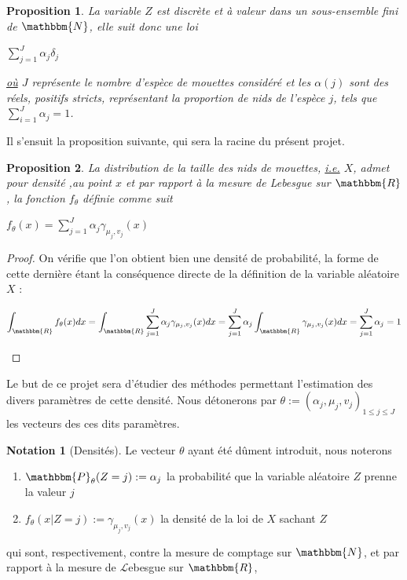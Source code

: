 \documentclass[frenchb]{report}
\newcommand{\R}{\mathbbm{R}}
\newcommand{\N}{\mathbbm{N}}
\newcommand{\1}{\mathbbm{1}}
\newcommand{\prob}{\mathbbm{P}}
\newtheorem{prop}{Proposition}
\theoremstyle{definition}\newtheorem{defn}{Définition}
\theoremstyle{definition}\newtheorem{exm}{Exemple}
\theoremstyle{definition}\newtheorem{nota}{Notation}
\theoremstyle{definition}\newtheorem{rem}{Remarque}
\begin{document}
\begin{prop}
La variable $Z$ est discrète et à valeur dans un sous-ensemble fini de $\N$, elle suit donc une loi 
\begin{center} $\displaystyle \sum_{j=1}^J \alpha_j\delta_j$ \end{center}
\underline{où} $J$ représente le nombre d'espèce de mouettes considéré et les $\alpha(j)$ sont des réels, positifs stricts, représentant la proportion de nids de l'espèce $j$, tels que $\displaystyle\sum_{i=1}^J \alpha_j = 1$.
\end{prop}

Il s'ensuit la proposition suivante, qui sera la racine du présent projet.
\begin{prop}
La distribution de la taille des nids de mouettes, \underline{i.e.} $X$, admet pour densité ,au point $x$ et par rapport à la mesure de Lebesgue sur $\R$, la fonction $f_ \theta$ définie comme suit
\begin{center} $f_\theta(x) = \displaystyle\sum_{j=1}^J \alpha_j \gamma_{\mu_j, v_j}(x) $ \end{center}
\end{prop}

\begin{proof}
On vérifie que l'on obtient bien une densité de probabilité, la forme de cette dernière étant la conséquence directe de la définition de la variable aléatoire $X$ : \newline
\begin{center} $\displaystyle\int_\R f_\theta(x) dx = \int_\R\sum_{j=1}^J \alpha_j \gamma_{\mu_j, v_j}(x)dx = \sum_{j=1}^J\alpha_j\int_\R \gamma_{\mu_j, v_j}(x)dx = \sum_{j=1}^J\alpha_j = 1$ \end{center}
\end{proof}

Le but de ce projet sera d'étudier des méthodes permettant l'estimation des divers paramètres de cette densité. Nous détonerons par $\theta := (\alpha_j, \mu_j, v_j)_{1\leq j\leq J}$ les vecteurs des ces dits paramètres.

\begin{nota}[Densités]
Le vecteur $\theta$ ayant été dûment introduit, nous noterons
\begin{enumerate}
	\item $\prob_\theta(Z=j) := \alpha_j$ la probabilité que la variable aléatoire $Z$ prenne la valeur $j$
	\item $f_\theta(x | Z=j) := \gamma_{\mu_j, v_j}(x)$  la densité de la loi de $X$ sachant $Z$
\end{enumerate}
qui sont, respectivement, contre la mesure de comptage sur $\N$, et par rapport à la mesure de $\mathcal{L}$ebesgue sur $\R$,
\end{nota}
\end{document}
